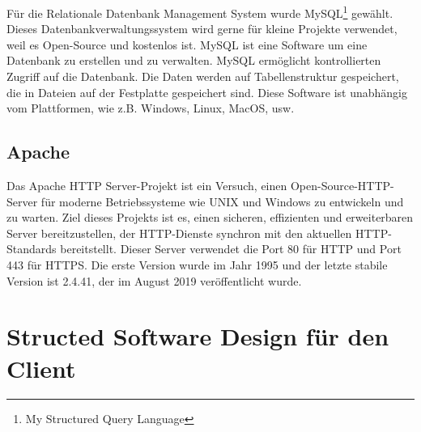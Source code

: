 F\"{u}r die Relationale Datenbank Management System wurde MySQL\footnote{My Structured Query Language} gew\"{a}hlt. Dieses Datenbankverwaltungssystem wird gerne f\"{u}r kleine Projekte verwendet, weil es Open-Source und kostenlos ist. MySQL ist eine Software um eine Datenbank zu erstellen und zu verwalten. MySQL erm\"{o}glicht kontrollierten Zugriff auf die Datenbank. Die Daten werden auf Tabellenstruktur gespeichert, die in Dateien auf der Festplatte gespeichert sind. Diese Software ist unabh\"angig vom Plattformen, wie z.B. Windows, Linux, MacOS, usw.


\subsection{Apache}

Das Apache HTTP Server-Projekt ist ein Versuch, einen Open-Source-HTTP-Server f\"{u}r moderne Betriebssysteme wie UNIX und Windows zu entwickeln und zu warten. Ziel dieses Projekts ist es, einen sicheren, effizienten und erweiterbaren Server bereitzustellen, der HTTP-Dienste synchron mit den aktuellen HTTP-Standards bereitstellt. Dieser Server verwendet die Port 80 f\"{u}r HTTP und Port 443 f\"{u}r HTTPS. Die erste Version wurde im Jahr 1995 und der letzte stabile Version ist 2.4.41, der im August 2019 ver\"{o}ffentlicht wurde. \cite{40_apache}





\section{Structed Software Design für den Client}


